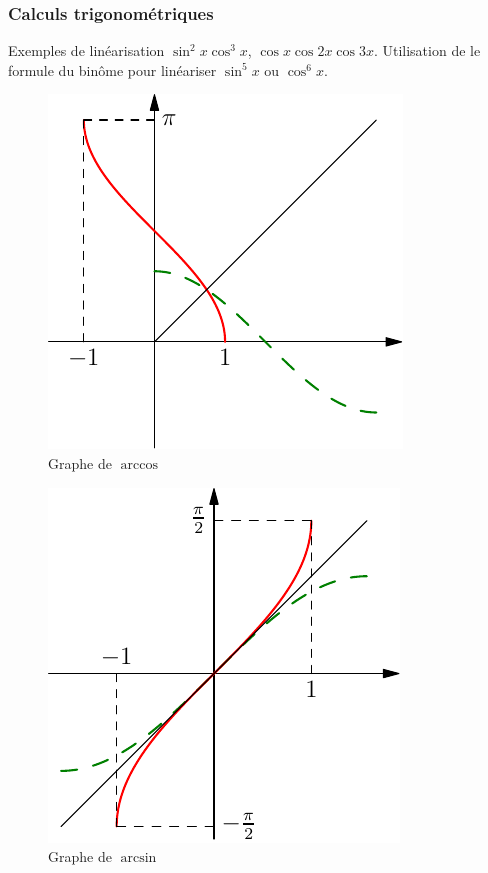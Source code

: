 \subsubsection{Calculs trigonométriques}
Exemples de linéarisation $\sin^2x\cos^3 x$, $ \cos x \cos2x \cos 3x$. Utilisation de le formule du binôme pour linéariser $\sin^5x$ ou $\cos^6 x$.
\begin{figure}[h!t]
 \centering
 \includegraphics{./C2004_1.pdf}
 \caption{Graphe de $\arccos$}
 \label{fig:C2004_1}
\end{figure}
\begin{figure}[h!t]
 \centering
 \includegraphics{./C2004_2.pdf}
 \caption{Graphe de $\arcsin$}
 \label{fig:C2004_2}
\end{figure}
